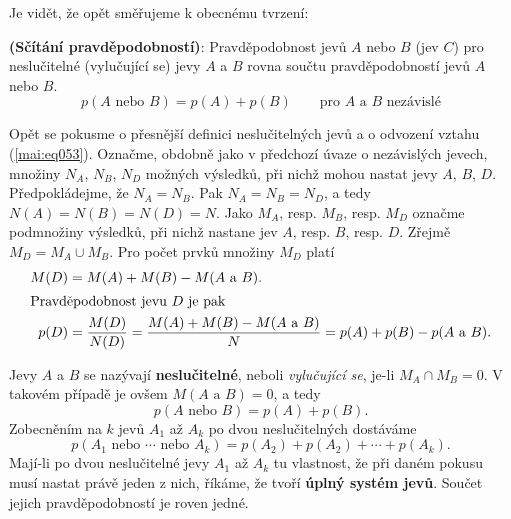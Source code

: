       
      
      Je vidět, že opět směřujeme k obecnému tvrzení:
      \begin{lemma}\label{mai:lemma004}
        \textbf{(Sčítání pravděpodobností)}: Pravděpodobnost jevů \(A\) nebo \(B\) (jev \(C\)) 
        pro neslučitelné (vylučující se) jevy \(A\) a \(B\) rovna součtu pravděpodobností jevů 
        \(A\) nebo \(B\).
        \begin{equation}\label{mai:eq053}
           p(A \text{ nebo } B)= p(A) + p(B)\qquad \text{pro } A \text{ a } B \text{ nezávislé}
        \end{equation}
      \end{lemma}
      
      Opět se pokusme o přesnější definici neslučitelných jevů a o odvození vztahu 
      (\ref{mai:eq053}). Označme, obdobně jako v předchozí úvaze o nezávislých jevech, množiny 
      \(N_A\), \(N_B\), \(N_D\) možných výsledků, při nichž mohou nastat jevy \(A\), \(B\), \(D\). 
      Předpokládejme, že \(N_A = N_B\). Pak \(N_A = N_B = N_D\), a tedy \(N(A) = N(B) = N(D) = N\). 
      Jako \(M_A\), resp. \(M_B\), resp. \(M_D\) označme podmnožiny výsledků, při nichž nastane jev 
      \(A\), resp. \(B\), resp. \(D\). Zřejmě \(M_D = M_A \cup M_B\). Pro počet prvků množiny 
      \(M_D\) platí 
      \begin{align*}
        M(D) &= M(A) + M(B) - M(A\text{ a }B).                                    \\
        \shortintertext{Pravděpodobnost jevu \(D\) je pak}
        p(D) &= \dfrac{M(D)}{N(D)} = \dfrac{M(A) + M(B) - M(A\text{ a }B)}{N} 
              = p(A) + p(B) - p(A\text{ a }B).
      \end{align*}
      
      Jevy \(A\) a \(B\) se nazývají \textbf{neslučitelné}, neboli \emph{vylučující se}, je-li 
      \(M_A \cap M_B = 0\). V takovém případě je ovšem \(M(A\text{ a }B) = 0\), a tedy
      \begin{equation*}
        p(A\text{ nebo }B) = p(A) + p(B).
      \end{equation*}
      Zobecněním na \(k\) jevů \(A_1\) až \(A_k\) po dvou neslučitelných dostáváme
      \begin{equation*}
        p(A_1\text{ nebo }\cdots\text{ nebo }A_k) = p(A_2) + p(A_2) + \cdots + p(A_k).
      \end{equation*}
      Mají-li po dvou neslučitelné jevy \(A_1\) až \(A_k\) tu vlastnost, že při daném pokusu musí 
      nastat právě jeden z nich, říkáme, že tvoří \textbf{úplný systém jevů}. Součet jejich 
      pravděpodobností je roven jedné.
      
